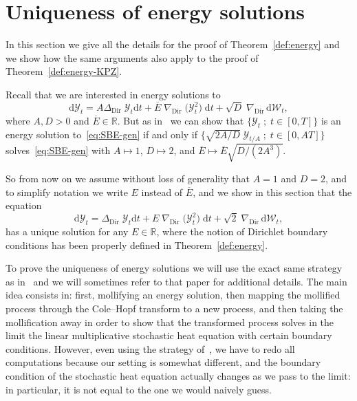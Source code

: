 \documentclass[10pt]{amsart}
\theoremstyle{definition}\newtheorem{defi}[theo]{Definition}\newtheorem{rema}[theo]{Remark}\newtheorem{exam}[theo]{Example}\newtheorem{exem}[theo]{Example}\newtheorem{nota}[theo]{Notation}
\DeclareMathOperator{\Dir}{Dir}
\newcommand{\bb}[1]{{\mathbb #1}}
\newcommand{\RR}{\mathbb R}
\newcommand{\mc}[1]{{\mathcal #1}}
\renewcommand{\mc}[1]{{\mathcal #1}}
\renewcommand{\bar}{\overline}
\newcommand*{\dd}{\mathrm{d}}
\newcommand*{\dt}{\dd t}
\begin{document}
\section{Uniqueness of energy solutions}\label{sec:energy-pr}

In this section we give all the details for the proof of Theorem~\ref{def:energy} and we show how the same arguments also apply to the proof of Theorem~\ref{def:energy-KPZ}.

Recall that we are interested in energy solutions to
\begin{equation}\label{eq:SBE-gen}
\dd\mathcal Y_t = A \Delta_{\Dir}\; \mathcal Y_t \dt + \bar{E}\;\nabla_{\Dir}\; \big(\mathcal{Y}_t^2 \big) \;\dt + \sqrt{D}\; \nabla_{\Dir}\,\dd\mc W_t,
\end{equation}
where $A, D>0$ and $\bar{E} \in \RR$. But as in~\cite[Remark~2.6]{Gubinelli2015Energy} we can show that $\{\mathcal Y_t \; ; \; t \in [0,T] \}$ is an energy solution to~\eqref{eq:SBE-gen} if and only if $\big\{\sqrt{2A/D} \; \mathcal Y_{t/A} \; ;\; t \in [0, A T]\big\}$ solves~\eqref{eq:SBE-gen} with $A \mapsto 1$, $D \mapsto 2$, and $ \bar{E} \mapsto \bar{E} \sqrt{D/(2A^3)}$.


So from now on we assume without loss of generality that $A = 1$ and $D=2$, and to simplify notation we write $E$ instead of $\bar{E}$, and we show in this section that the equation
\begin{equation}\label{eq:SBE-gen2}
\dd\mathcal Y_t = \Delta_{\Dir}\; \mathcal Y_t \dt + E\;\nabla_{\Dir}\; \big(\mathcal{Y}_t^2 \big) \;\dt + \sqrt{2}\; \nabla_{\Dir}\,\dd\mc W_t,
\end{equation}
has a unique solution for any $E\in\bb R$, where the notion of Dirichlet boundary conditions has been properly defined in Theorem~\ref{def:energy}.

To prove the uniqueness of energy solutions we will use the exact same strategy as in~\cite{Gubinelli2015Energy} and we will sometimes refer to that paper for additional details. The main idea consists in: first, mollifying an energy solution, then mapping the mollified process through the Cole--Hopf transform to a new process, and then taking the mollification away in order to show that the transformed process solves in the limit the linear multiplicative stochastic heat equation with certain boundary conditions. However, even using the strategy of~\cite{Gubinelli2015Energy}, we have to redo all computations because our setting is somewhat different, and the boundary condition of the stochastic heat equation actually changes as we pass to the limit: in particular, it is not equal to the one we would naively guess.
\end{document}
